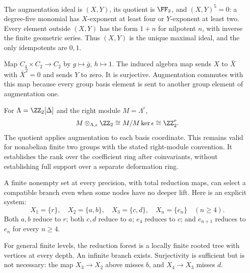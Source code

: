 The augmentation ideal is $(X,Y)$, its quotient is $\FF_2$, and $(X,Y)^5=0$: a degree-five monomial has $X$-exponent at least four or $Y$-exponent at least two. Every element outside $(X,Y)$ has the form $1+n$ for nilpotent $n$, with inverse the finite geometric series. Thus $(X,Y)$ is the unique maximal ideal, and the only idempotents are $0,1$.

Map $C_4\times C_2\to C_2$ by $g\mapsto\bar g$, $h\mapsto1$. The induced algebra map sends $X$ to $\bar X$ with $\bar X^2=0$ and sends $Y$ to zero. It is surjective. Augmentation commutes with this map because every group basis element is sent to another group element of augmentation one.

For $\Lambda=\ZZ_2[\Delta]$ and the right module $M=\Lambda^r$,
\[
M\otimes_{\Lambda,\epsilon}\ZZ_2
\cong M/M\ker\epsilon\cong\ZZ_2^r.
\]
The quotient applies augmentation to each basis coordinate. This remains valid for nonabelian finite two groups with the stated right-module convention. It establishes the rank over the coefficient ring after coinvariants, without establishing full support over a separate deformation ring.


A finite nonempty set at every precision, with total reduction maps, can select a compatible branch even when some nodes have no deeper lift. Here is an explicit system:
\[
X_1=\{r\},\quad X_2=\{a,b\},\quad X_3=\{c,d\},\quad
X_n=\{e_n\}\quad(n\ge4).
\]
Both $a,b$ reduce to $r$; both $c,d$ reduce to $a$; $e_4$ reduces to $c$; and $e_{n+1}$ reduces to $e_n$ for every $n\ge4$.


For general finite levels, the reduction forest is a locally finite rooted tree with vertices at every depth. An infinite branch exists. Surjectivity is sufficient but is not necessary: the map $X_3\to X_2$ above misses $b$, and $X_4\to X_3$ misses $d$.

